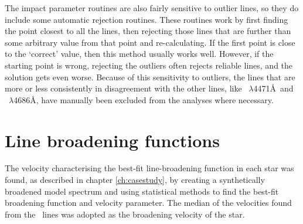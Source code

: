 The impact parameter routines are also fairly sensitive to outlier
lines, so they do include some automatic rejection routines. These
routines work by first finding the point closest to all the lines,
then rejecting those lines that are further than some arbitrary value
from that point and re-calculating. If the first point is close to the
`correct' value, then this method usually works well. However, if the
starting point is wrong, rejecting the outliers often rejects reliable
lines, and the solution gets even worse. Because of this sensitivity
to outliers, the lines that are more or less consistently in
disagreement with the other lines, like \hei~$\lambda$4471\AA\ and
\heii~$\lambda$4686\AA, have manually been excluded from
the analyses where necessary.


\section{Line broadening functions}
\label{sec:broadening}

The velocity characterising the best-fit line-broadening function in
each star was found, as described in chapter \ref{ch:casestudy}, by
creating a synthetically broadened model spectrum and using
statistical methods to find the best-fit broadening function and
velocity parameter. The median of the velocities found from the \hei\
lines was adopted as the broadening velocity of the star.

